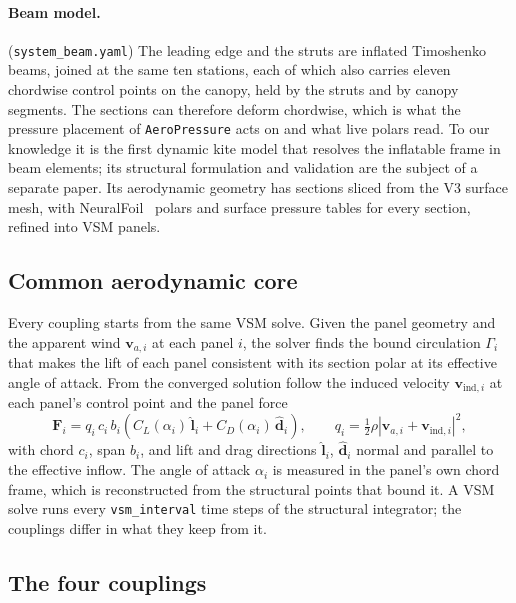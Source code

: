 \documentclass[11pt,a4paper]{article}
\newcommand{\code}[1]{\texttt{#1}}
\newcommand{\vect}[1]{\boldsymbol{#1}}
\begin{document}
\paragraph{Beam model.} (\code{system\_beam.yaml}) The leading edge and the struts are inflated Timoshenko beams, joined at the same ten stations, each of which also carries eleven chordwise control points on the canopy, held by the struts and by canopy segments. The sections can therefore deform chordwise, which is what the pressure placement of \code{AeroPressure} acts on and what live polars read. To our knowledge it is the first dynamic kite model that resolves the inflatable frame in beam elements; its structural formulation and validation are the subject of a separate paper. Its aerodynamic geometry has \NumSectionsBeam{} sections sliced from the V3 surface mesh, with NeuralFoil~\citep{neuralfoil} polars and surface pressure tables for every section, refined into \NumPanelsBeam{} VSM panels.

\subsection{Common aerodynamic core}

Every coupling starts from the same VSM solve. Given the panel geometry and the apparent wind $\vect{v}_{a,i}$ at each panel $i$, the solver finds the bound circulation $\Gamma_i$ that makes the lift of each panel consistent with its section polar at its effective angle of attack. From the converged solution follow the induced velocity $\vect{v}_{\mathrm{ind},i}$ at each panel's control point and the panel force
\begin{equation}
  \vect{F}_i = q_i\, c_i\, b_i \left( C_{L}(\alpha_i)\,\hat{\vect{l}}_i
             + C_{D}(\alpha_i)\,\hat{\vect{d}}_i \right),
  \qquad
  q_i = \tfrac{1}{2}\rho \left| \vect{v}_{a,i} + \vect{v}_{\mathrm{ind},i} \right|^2 ,
  \label{eq:panel-force}
\end{equation}
with chord $c_i$, span $b_i$, and lift and drag directions $\hat{\vect{l}}_i$, $\hat{\vect{d}}_i$ normal and parallel to the effective inflow. The angle of attack $\alpha_i$ is measured in the panel's own chord frame, which is reconstructed from the structural points that bound it. A VSM solve runs every \code{vsm\_interval} time steps of the structural integrator; the couplings differ in what they keep from it.

\subsection{The four couplings}
\end{document}
